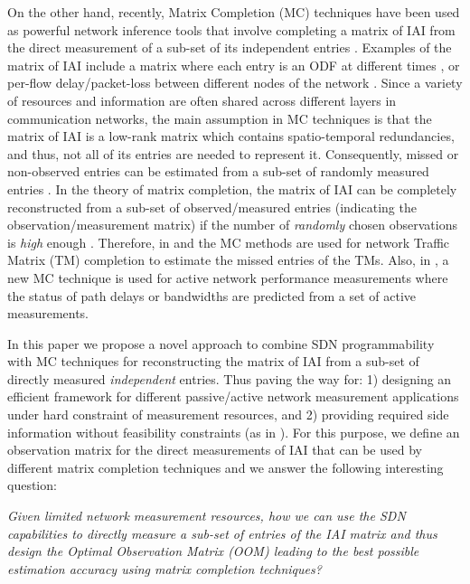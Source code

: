 On the other hand, recently, Matrix Completion (MC) techniques have
been used as powerful network inference tools that involve completing
a matrix of IAI from the direct measurement of a sub-set of its
independent entries
\cite{Roughan:2012}\cite{Gursun:2011}\cite{YLiao:2011}. Examples of
the matrix of IAI include a matrix where each entry is an ODF at
different times \cite{Roughan:2012}, or per-flow delay/packet-loss
between different nodes of the network \cite{YLiao:2011}. Since a
variety of resources and information are often shared across different
layers in communication networks, the main assumption in MC techniques
is that the matrix of IAI is a low-rank matrix which contains
spatio-temporal redundancies, and thus, not all of its entries are
needed to represent it. Consequently, missed or non-observed entries can
be estimated from a sub-set of randomly measured entries \cite{Candes:2009}. In the
theory of matrix completion, the matrix of IAI can be completely
reconstructed from a sub-set of observed/measured entries (indicating
the observation/measurement matrix) if the number of \emph{randomly}
chosen observations is \emph{high} enough
\cite{Candes:2009}\cite{Candes:2010}. Therefore, in
\cite{Roughan:2012} and \cite{Gursun:2011} the MC methods are used for
network Traffic Matrix (TM) completion to estimate the missed entries
of the TMs. Also, in \cite{YLiao:2011}, a new MC technique is used for active network performance measurements where the status of path delays or bandwidths are predicted from a set of active
measurements.

In this paper we propose a novel approach to combine SDN
programmability with MC techniques for reconstructing the matrix of
IAI from a sub-set of directly measured \emph{independent}
entries. Thus paving the way for: 1) designing an efficient framework
for different passive/active network measurement applications under
hard constraint of measurement resources, and 2) providing required
side information without feasibility constraints (as in
\cite{IF14iSTAMP:2014}). For this purpose, we define an observation matrix for the direct measurements of IAI that can be used by different matrix completion techniques and we answer the following interesting question:

\emph{Given limited network measurement resources, how we can use the SDN capabilities to directly measure a sub-set of entries of the IAI matrix and thus design the Optimal Observation Matrix (OOM) leading to the best possible estimation accuracy using matrix completion techniques?}

